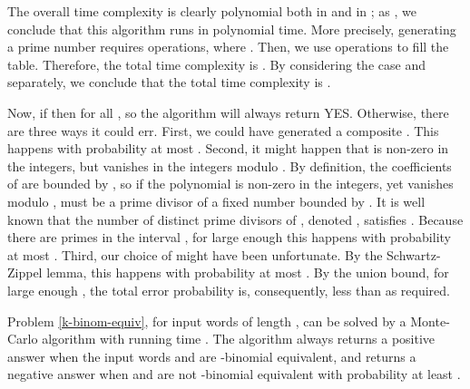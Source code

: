 \documentclass[runningheads]{llncs}
\begin{document}
\vskip 0.2cm  \begin{small}
    \begin{center}
  \end{center}
  \end{small}
  
The overall time complexity is clearly polynomial both in  and in ; as , we conclude that this algorithm runs in polynomial time. More precisely, generating a prime number requires  operations, where . Then, we use  operations to fill the table. Therefore, the total time complexity is . By considering the case  and  separately, we conclude that the total time complexity is .

Now, if  then  for all , so the algorithm will always return YES.
Otherwise, there are three ways it could err. First, we could have generated a composite .
This happens with probability at most .
Second, it might happen that  is non-zero in the integers, but vanishes in the integers modulo .
By definition, the coefficients of  are bounded by , so if the polynomial is non-zero in the integers, yet vanishes modulo ,  must be a prime divisor of a fixed number bounded by . It is well known that the number of distinct prime divisors of , denoted , satisfies . Because there are  primes in the interval , for  large enough this happens with probability at most .
Third, our choice of  might have been unfortunate. By the Schwartz-Zippel lemma,
this happens with probability at most .
By the union bound, for large enough , the total error probability is, consequently, less than  as required.

\begin{theorem}
Problem \ref{k-binom-equiv}, for input words of length , can be solved by a Monte-Carlo algorithm with running time . The algorithm always returns a positive answer when the input words  and  are -binomial equivalent, and returns a negative answer when  and  are not -binomial equivalent with probability at least .
\end{theorem}
\end{document}
